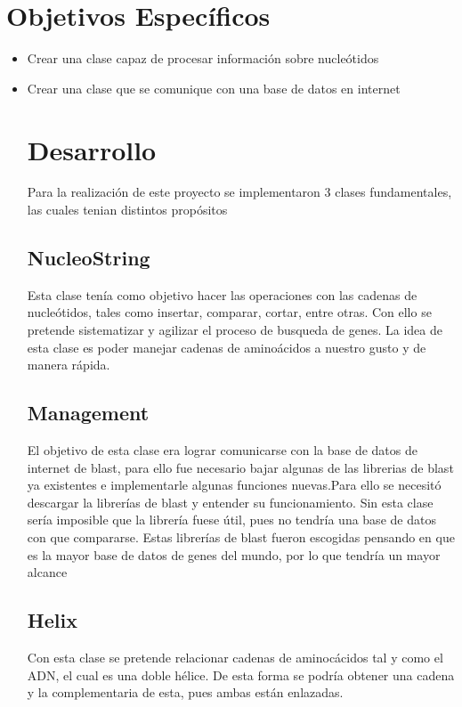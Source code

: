 \documentclass{article}
\begin{document}
\section{Objetivos Específicos}
\begin{itemize}
\item Crear una clase capaz  de procesar información sobre nucleótidos  
\item Crear una clase que se comunique con una base de datos en internet

\section{Desarrollo}
Para la realización de este proyecto se implementaron 3 clases fundamentales, las cuales tenian distintos propósitos 


\subsection{NucleoString}
	Esta clase tenía como objetivo hacer las operaciones con las cadenas de nucleótidos, tales como insertar, comparar, cortar, entre otras. Con ello se pretende sistematizar y agilizar el proceso de busqueda de genes. La idea de esta clase es poder manejar cadenas de aminoácidos a nuestro gusto y de manera rápida.
	
\subsection{Management}
	El objetivo de esta clase era lograr comunicarse con la base de datos de internet de blast, para ello fue necesario bajar algunas de las librerias de blast ya existentes e implementarle algunas funciones nuevas.Para ello se necesitó descargar la librerías de blast y entender su funcionamiento. Sin esta clase sería imposible que la librería fuese útil, pues no tendría una base de datos con que compararse. Estas librerías de blast fueron escogidas pensando en que es la mayor base de datos de genes del mundo, por lo que tendría un mayor alcance
	
\subsection{Helix}
	Con esta clase se pretende relacionar cadenas de aminocácidos tal y como el ADN, el cual es una doble hélice. De esta forma se podría obtener una cadena y la complementaria de esta, pues ambas están enlazadas. 



\end{itemize}
\end{document}

